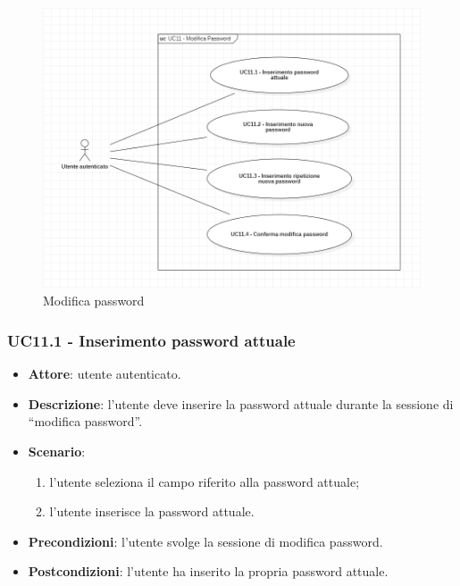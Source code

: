 \begin{figure}[!h]
    \includegraphics[width=15cm]{sezioni/Images/UC11_s.png}
    \centering
    \caption{Modifica password}
\end{figure}

\subsubsection{UC11.1 - Inserimento password attuale} 
\begin{itemize}
    \item \textbf{Attore}: utente autenticato.
    \item \textbf{Descrizione}: l'utente deve inserire la password attuale durante la sessione di “modifica password”.
    \item \textbf{Scenario}:
    \begin{enumerate}
        \item l'utente seleziona il campo riferito alla password attuale;
        \item l'utente inserisce la password attuale.
    \end{enumerate}

    \item \textbf{Precondizioni}: l'utente svolge la sessione di modifica password.
    \item \textbf{Postcondizioni}: l'utente ha inserito la propria password attuale.

\end{itemize}

